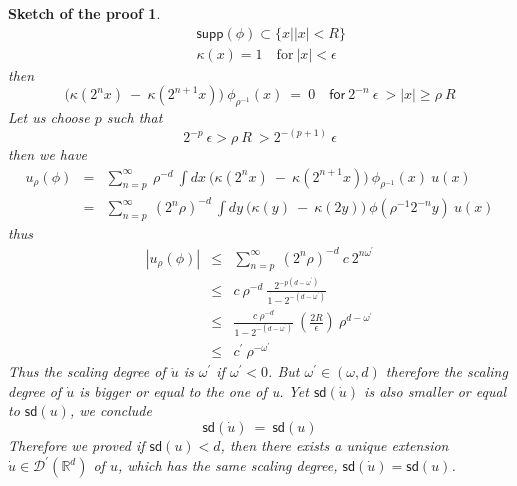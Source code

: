 \documentclass[11pt]{book}
\newcommand{\supp}{\mathsf{supp}}
\newcommand{\sd}{\mathsf{sd}}
\newcommand{\abs}[1]{\left|#1\right|}
\newcommand{\Dcal}{\mathcal{D}}
\newcommand{\Rbb}{\mathbb{R}}
\theoremstyle{break}
\newtheorem{sketch}{Sketch of the proof}[chapter]
\begin{document}
\begin{sketch}
\begin{eqnarray*}
  && \supp(\phi) \subset \{ x | \abs{x} < R \} \\
  && \kappa(x) = 1 \quad \text{for} \ \abs{x} < \epsilon
 \end{eqnarray*}
 then
 \begin{equation*}
  \bigg( \kappa(2^n x) \ - \ \kappa(2^{n+1} x) \bigg) \ \phi_{\rho^{-1}}(x) \ = \ 0 \quad \mathsf{for} \ 2^{-n} \ \epsilon \ > \abs{x} \geq \rho \ R
 \end{equation*}
 Let us choose $p$ such that 
 \begin{equation*}
  2^{-p} \ \epsilon > \rho \ R \ > 2^{-(p+1)} \ \epsilon
 \end{equation*}
 then we have
 \begin{eqnarray*}
  u_\rho(\phi) &=& \sum_{n=p}^{\infty} \ \rho^{-d} \ \int dx \ \bigg( \kappa(2^n x) \ - \ \kappa(2^{n+1} x) \bigg) \ \phi_{\rho^{-1}}(x) \ u(x) \\
  &=& \sum_{n=p}^{\infty} \ (2^n\rho)^{-d} \ \int dy \ \bigg( \kappa(y) \ - \ \kappa(2 y) \bigg) \ \phi(\rho^{-1}2^{-n}y) \ u(x) 
 \end{eqnarray*}
 thus
 \begin{eqnarray*}
  \abs{u_\rho(\phi)} &\leq& \sum_{n=p}^{\infty} \ (2^n\rho)^{-d} \ c \ 2^{n\omega^\prime} \\
  &\leq& c \ \rho^{-d} \ \frac{2^{-p(d-\omega^\prime)}}{1 - 2^{-(d-\omega^\prime)}} \\
  &\leq& \frac{c \ \rho^{-d}}{1 - 2^{-(d-\omega^\prime)}} \ \left( \frac{2R}{\epsilon} \right) \ \rho^{d-\omega^\prime} \\
  &\leq& c^\prime \ \rho^{-\omega^\prime}
 \end{eqnarray*}
 Thus the scaling degree of $\dot{u}$ is $\omega^\prime$ if $\omega^\prime < 0$. But $\omega^\prime \in (\omega,d)$ therefore the scaling degree of $\dot{u}$ is bigger or equal to the one of u. Yet $\sd(\dot{u})$ is also smaller or equal to $\sd(u)$, we conclude 
 \begin{equation*}
  \sd(\dot{u}) \ = \ \sd(u)  
 \end{equation*}
 Therefore we proved if $\sd(u)<d$, then there exists a unique extension $\dot{u} \in \Dcal^\prime(\Rbb^d)$ of $u$, which has the same scaling degree, $\sd(\dot{u})=\sd(u)$. \\
 

\end{sketch}
\end{document}
